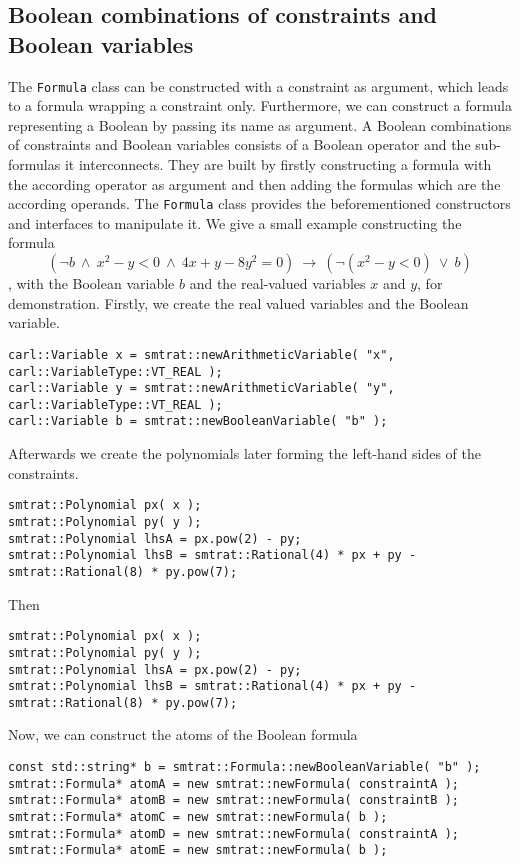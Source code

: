 \subsection{Boolean combinations of constraints and Boolean variables}
The \texttt{Formula} class can be constructed with a constraint as argument, which leads to a formula wrapping a constraint only. Furthermore, we can construct a formula representing a Boolean by passing its name as argument. A Boolean combinations of constraints and Boolean variables consists of a Boolean operator and the sub-formulas it interconnects. They are built by firstly constructing a formula with the according operator as argument and then adding the formulas which are the according operands. The \texttt{Formula} class provides the beforementioned constructors and interfaces to manipulate it. We give a small example constructing the formula \[(\neg b\ \land\ x^2-y<0\ \land\ 4x+y-8y^2=0 )\ \rightarrow\ (\neg(x^2-y<0)\ \lor\ b )\]
, with the Boolean variable $b$ and the real-valued variables $x$ and $y$, for demonstration. Firstly, we create the real valued variables and the Boolean variable.
\scriptsize
\begin{verbatim}
carl::Variable x = smtrat::newArithmeticVariable( "x", carl::VariableType::VT_REAL );
carl::Variable y = smtrat::newArithmeticVariable( "y", carl::VariableType::VT_REAL );
carl::Variable b = smtrat::newBooleanVariable( "b" );
\end{verbatim}
\normalsize
Afterwards we create the polynomials later forming the left-hand sides of the constraints.
\scriptsize
\begin{verbatim}
smtrat::Polynomial px( x );
smtrat::Polynomial py( y );
smtrat::Polynomial lhsA = px.pow(2) - py;
smtrat::Polynomial lhsB = smtrat::Rational(4) * px + py - smtrat::Rational(8) * py.pow(7);
\end{verbatim}
\normalsize
Then 
\scriptsize
\begin{verbatim}
smtrat::Polynomial px( x );
smtrat::Polynomial py( y );
smtrat::Polynomial lhsA = px.pow(2) - py;
smtrat::Polynomial lhsB = smtrat::Rational(4) * px + py - smtrat::Rational(8) * py.pow(7);
\end{verbatim}
\normalsize
Now, we can construct the atoms of the Boolean formula
\scriptsize
\begin{verbatim}
const std::string* b = smtrat::Formula::newBooleanVariable( "b" );
smtrat::Formula* atomA = new smtrat::newFormula( constraintA );
smtrat::Formula* atomB = new smtrat::newFormula( constraintB );
smtrat::Formula* atomC = new smtrat::newFormula( b );
smtrat::Formula* atomD = new smtrat::newFormula( constraintA );
smtrat::Formula* atomE = new smtrat::newFormula( b );
\end{verbatim}
